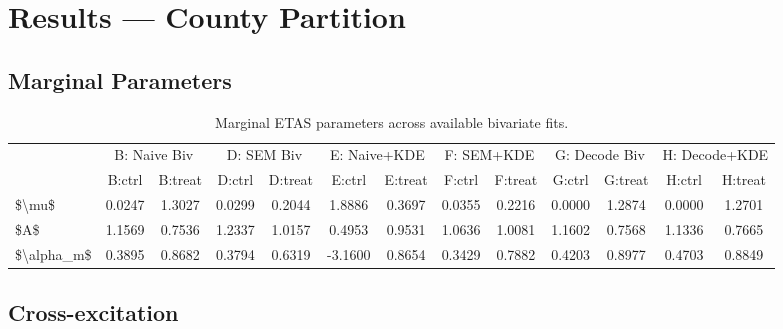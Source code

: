 \documentclass[
]{article}
\begin{document}
\section{Results --- County Partition}\label{results-county-partition}

\subsection{Marginal Parameters}\label{marginal-parameters}

\begingroup\fontsize{8}{10}\selectfont

\begin{longtable}[t]{lcccccccccccc}

\caption{\label{tbl-params}Marginal ETAS parameters across available
bivariate fits.}

\tabularnewline

\\
\toprule
\multicolumn{1}{c}{ } & \multicolumn{2}{c}{B: Naive Biv} & \multicolumn{2}{c}{D: SEM Biv} & \multicolumn{2}{c}{E: Naive+KDE} & \multicolumn{2}{c}{F: SEM+KDE} & \multicolumn{2}{c}{G: Decode Biv} & \multicolumn{2}{c}{H: Decode+KDE} \\
\cmidrule(l{3pt}r{3pt}){2-3} \cmidrule(l{3pt}r{3pt}){4-5} \cmidrule(l{3pt}r{3pt}){6-7} \cmidrule(l{3pt}r{3pt}){8-9} \cmidrule(l{3pt}r{3pt}){10-11} \cmidrule(l{3pt}r{3pt}){12-13}
 & B:ctrl & B:treat & D:ctrl & D:treat & E:ctrl & E:treat & F:ctrl & F:treat & G:ctrl & G:treat & H:ctrl & H:treat\\
\midrule
\$\textbackslash{}mu\$ & 0.0247 & 1.3027 & 0.0299 & 0.2044 & 1.8886 & 0.3697 & 0.0355 & 0.2216 & 0.0000 & 1.2874 & 0.0000 & 1.2701\\
\$A\$ & 1.1569 & 0.7536 & 1.2337 & 1.0157 & 0.4953 & 0.9531 & 1.0636 & 1.0081 & 1.1602 & 0.7568 & 1.1336 & 0.7665\\
\$\textbackslash{}alpha\_m\$ & 0.3895 & 0.8682 & 0.3794 & 0.6319 & -3.1600 & 0.8654 & 0.3429 & 0.7882 & 0.4203 & 0.8977 & 0.4703 & 0.8849\\
\bottomrule

\end{longtable}

\endgroup{}

\subsection{Cross-excitation}\label{cross-excitation}
\end{document}
